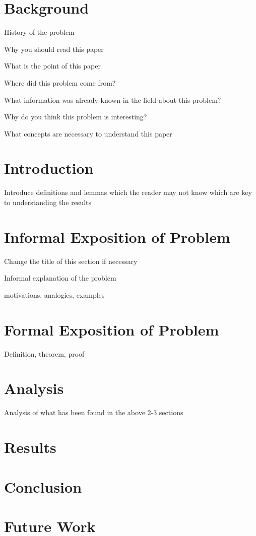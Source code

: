\section*{Background}
\label{sec:back}

History of the problem

Why you should read this paper

What is the point of this paper

Where did this problem come from?

What information was already known in the field about this problem?

Why do you think this problem is interesting?

What concepts are necessary to understand this paper


\section*{Introduction}
\label{sec:intro}

Introduce definitions and lemmas which the reader may not know which are key to understanding the results


\section*{Informal Exposition of Problem}
\label{sec:inf}

Change the title of this section if necessary

Informal explanation of the problem

motivations, analogies, examples


\section*{Formal Exposition of Problem}
\label{sec:form}


Definition, theorem, proof


\section*{Analysis}
\label{sec:ana}

Analysis of what has been found in the above 2-3 sections


\section*{Results}
\label{sec:res}


\section*{Conclusion}
\label{sec:conc}


\section*{Future Work}
\label{sec:fut}




